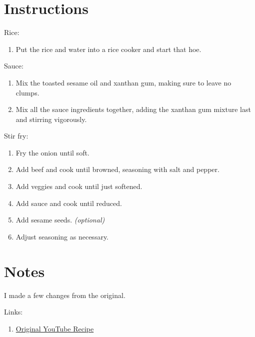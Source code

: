 \documentclass[11pt]{article}
\begin{document}
	\section*{Instructions}
	Rice:
	\begin{enumerate}
		\item Put the rice and water into a rice cooker and start that hoe.
	\end{enumerate}
	
	Sauce:
	\begin{enumerate}
		\item Mix the toasted sesame oil and xanthan gum, making sure to leave no clumps.
		\item Mix all the sauce ingredients together, adding the xanthan gum mixture last and stirring vigorously.
	\end{enumerate}
	
	Stir fry:
	\begin{enumerate}
		\item Fry the onion until soft.
		\item Add beef and cook until browned, seasoning with salt and pepper.
		\item Add veggies and cook until just softened.
		\item Add sauce and cook until reduced.
		\item Add sesame seeds. \textit{(optional)}
		\item Adjust seasoning as necessary.
	\end{enumerate}
	
	
	\section*{Notes}
	I made a few changes from the original.
	
	Links:
	\begin{enumerate}
		\item\href{https://www.youtube.com/watch?v=kBivrTwvTVU}{Original YouTube Recipe} 
	\end{enumerate}
	
\end{document}
